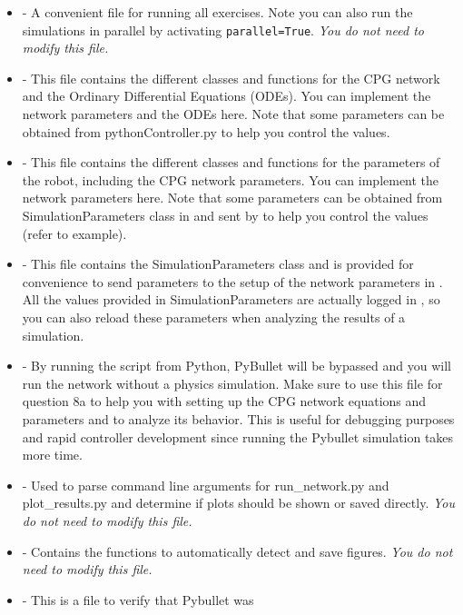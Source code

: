 \documentclass{cmc}
\begin{document}
\begin{itemize}
\item {} - A convenient file for running all
  exercises. Note you can also run the simulations in parallel by activating
  \texttt{parallel=True}. \textit{You do not need to modify this file.}
\item {} - This file contains the different classes and
  functions for the CPG network and the Ordinary Differential Equations
  (ODEs). You can implement the network parameters and the ODEs here. Note that
  some parameters can be obtained from pythonController.py to help you control
  the values.
\item {} - This file contains the different
  classes and functions for the parameters of the robot, including the CPG
  network parameters. You can implement the network parameters here. Note that
  some parameters can be obtained from SimulationParameters class in
   and sent by  to help
  you control the values (refer to example).
\item {} - This file contains the
  SimulationParameters class and is provided for convenience to send parameters
  to the setup of the network parameters in . All the
  values provided in SimulationParameters are actually logged in
  , so you can also reload these parameters when analyzing
  the results of a simulation.
\item {} - By running the script from Python,
  PyBullet will be bypassed and you will run the network without a physics
  simulation. Make sure to use this file for question 8a to help you with
  setting up the CPG network equations and parameters and to analyze its
  behavior. This is useful for debugging purposes and rapid controller
  development since running the Pybullet simulation takes more time.
\item {} - Used to parse command line arguments for
  run\_network.py and plot\_results.py and determine if plots should be shown or
  saved directly. \textit{You do not need to modify this file.}
\item {} - Contains the functions to automatically
  detect and save figures. \textit{You do not need to modify this file.}
\item {} - This is a file to verify that Pybullet was

\end{itemize}
\end{document}
